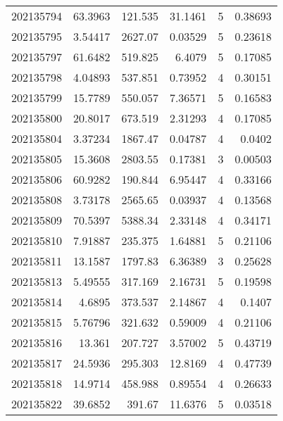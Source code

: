 \begin{tabular}{rrrrrr}
 202135794 &         63.3963  &      121.535  &           31.1461  &           5 & 0.38693 \\
 202135795 &          3.54417 &     2627.07   &            0.03529 &           5 & 0.23618 \\
 202135797 &         61.6482  &      519.825  &            6.4079  &           5 & 0.17085 \\
 202135798 &          4.04893 &      537.851  &            0.73952 &           4 & 0.30151 \\
 202135799 &         15.7789  &      550.057  &            7.36571 &           5 & 0.16583 \\
 202135800 &         20.8017  &      673.519  &            2.31293 &           4 & 0.17085 \\
 202135804 &          3.37234 &     1867.47   &            0.04787 &           4 & 0.0402  \\
 202135805 &         15.3608  &     2803.55   &            0.17381 &           3 & 0.00503 \\
 202135806 &         60.9282  &      190.844  &            6.95447 &           4 & 0.33166 \\
 202135808 &          3.73178 &     2565.65   &            0.03937 &           4 & 0.13568 \\
 202135809 &         70.5397  &     5388.34   &            2.33148 &           4 & 0.34171 \\
 202135810 &          7.91887 &      235.375  &            1.64881 &           5 & 0.21106 \\
 202135811 &         13.1587  &     1797.83   &            6.36389 &           3 & 0.25628 \\
 202135813 &          5.49555 &      317.169  &            2.16731 &           5 & 0.19598 \\
 202135814 &          4.6895  &      373.537  &            2.14867 &           4 & 0.1407  \\
 202135815 &          5.76796 &      321.632  &            0.59009 &           4 & 0.21106 \\
 202135816 &         13.361   &      207.727  &            3.57002 &           5 & 0.43719 \\
 202135817 &         24.5936  &      295.303  &           12.8169  &           4 & 0.47739 \\
 202135818 &         14.9714  &      458.988  &            0.89554 &           4 & 0.26633 \\
 202135822 &         39.6852  &      391.67   &           11.6376  &           5 & 0.03518 \\

\end{tabular}
